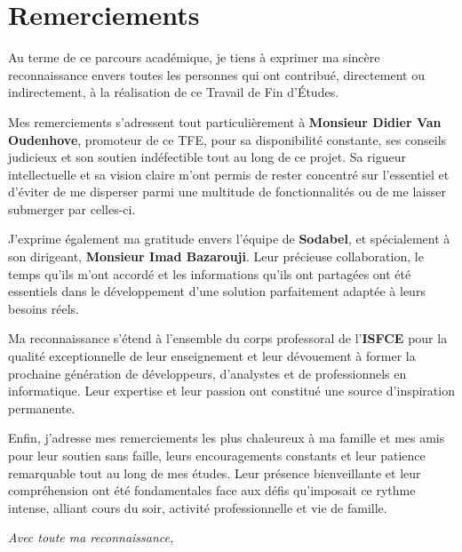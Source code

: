 \chapter*{Remerciements}

\noindent Au terme de ce parcours académique, je tiens à exprimer ma sincère reconnaissance envers toutes les personnes qui ont contribué, directement ou indirectement, à la réalisation de ce Travail de Fin d'Études.

\vspace{0.5cm}
\noindent Mes remerciements s'adressent tout particulièrement à \textbf{Monsieur Didier Van Oudenhove}, promoteur de ce TFE, pour sa disponibilité constante, ses conseils judicieux et son soutien indéfectible tout au long de ce projet. Sa rigueur intellectuelle et sa vision claire m'ont permis de rester concentré sur l'essentiel et d'éviter de me disperser parmi une multitude de fonctionnalités ou de me laisser submerger par celles-ci.

\vspace{0.5cm}
\noindent J'exprime également ma gratitude envers l'équipe de \textbf{Sodabel}, et spécialement à son dirigeant, \textbf{Monsieur Imad Bazarouji}. Leur précieuse collaboration, le temps qu'ils m'ont accordé et les informations qu'ils ont partagées ont été essentiels dans le développement d'une solution parfaitement adaptée à leurs besoins réels.

\vspace{0.5cm}
\noindent Ma reconnaissance s'étend à l'ensemble du corps professoral de l'\textbf{ISFCE} pour la qualité exceptionnelle de leur enseignement et leur dévouement à former la prochaine génération de développeurs, d'analystes et de professionnels en informatique. Leur expertise et leur passion ont constitué une source d'inspiration permanente.

\vspace{0.5cm}
\noindent Enfin, j'adresse mes remerciements les plus chaleureux à ma famille et mes amis pour leur soutien sans faille, leurs encouragements constants et leur patience remarquable tout au long de mes études. Leur présence bienveillante et leur compréhension ont été fondamentales face aux défis qu'imposait ce rythme intense, alliant cours du soir, activité professionnelle et vie de famille.

\vspace{1cm}
\begin{flushright}
\textit{Avec toute ma reconnaissance,}\\
\vspace{0.3cm}
\end{flushright}

\newpage
